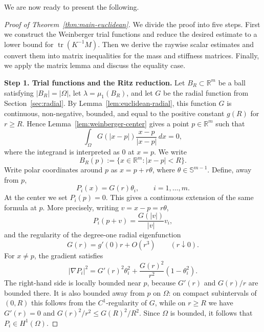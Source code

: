 \documentclass[11pt,letterpaper,reqno]{amsart}
\theoremstyle{definition}
\DeclareMathOperator{\tr}{tr}
\newcommand{\R}{\mathbb R}
\newcommand{\Sph}{\mathbb S}
\begin{document}
We are now ready to present the following.




\begin{proof}[Proof of Theorem~\ref{thm:main-euclidean}]
We divide the proof into five steps. First we construct the Weinberger
trial functions and reduce the desired estimate to a lower bound for
\(\tr(K^{-1}M)\). Then we derive the raywise scalar estimates and convert
them into matrix inequalities for the mass and stiffness matrices. Finally,
we apply the matrix lemma and discuss the equality case.

\medskip
\noindent\textbf{Step 1. Trial functions and the Ritz reduction.}
Let \(B_R\subset\R^m\) be a ball satisfying \(|B_R|=|\Omega|\), let \(\lambda=\mu_1(B_R)\), and let \(G\) be the radial function from Section~\ref{sec:radial}. By Lemma~\ref{lem:euclidean-radial}, this function \(G\) is continuous, non-negative, bounded, and equal to the positive constant \(g(R)\) for \(r\ge R\). Hence Lemma~\ref{lem:weinberger-center} gives a point \(p\in\R^m\) such that
\begin{equation}\label{eq:euclidean-center-condition}
        \int_\Omega G(|x-p|)\frac{x-p}{|x-p|}\,dx=0,
\end{equation}
where the integrand is interpreted as \(0\) at \(x=p\). We write
\[
        B_R(p):=\{x\in\mathbb R^m:|x-p|<R\}.
\]
Write polar coordinates around \(p\) as $x=p+r\theta$, where $\theta\in\Sph^{m-1}$. Define, away from \(p\),
\[
        P_i(x)=G(r)\theta_i,
        \qquad i=1,\ldots,m.
\]
At the center we set \(P_i(p)=0\). This gives a continuous extension of the same formula at \(p\). More precisely, writing \(v=x-p=r\theta\),
\[
        P_i(p+v)=\frac{G(|v|)}{|v|}v_i,
\]
and the regularity of the degree-one radial eigenfunction
\[
        G(r)=g'(0)r+O(r^3)\qquad(r\downarrow0).
\]
For \(x\ne p\), the gradient satisfies
\[
|\nabla P_i|^2
=
G'(r)^2\theta_i^2+\frac{G(r)^2}{r^2}(1-\theta_i^2).
\]
The right-hand side is locally bounded near \(p\), because \(G'(r)\) and
\(G(r)/r\) are bounded there. It is also bounded away from \(p\) on
\(\Omega\): on compact subintervals
of \((0,R)\) this follows from the \(C^1\)-regularity of \(G\), while on
\(r\ge R\) we have \(G'(r)=0\) and \(G(r)^2/r^2\le G(R)^2/R^2\).
Since \(\Omega\) is bounded, it follows that \(P_i\in H^1(\Omega)\). 



\end{proof}
\end{document}
